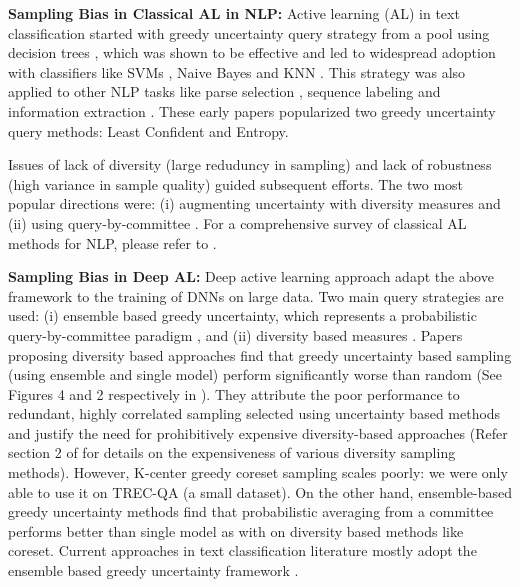 \documentclass[11pt,a4paper]{article}
\begin{document}
\textbf{Sampling Bias in Classical AL in NLP:} Active learning (AL) in text classification started with greedy uncertainty query strategy from a pool using decision trees \cite{lewis1994sequential}, which was shown to be effective and led to widespread adoption with classifiers like SVMs \cite{tong2001support}, Naive Bayes \cite{roy2001toward} and KNN \cite{fujii1998selective}. This strategy was also applied to other NLP tasks like parse selection \cite{baldridge2004active}, sequence labeling \cite{settles2008analysis} and information extraction \cite{thompson1999active}. These early papers popularized two greedy uncertainty query methods: Least Confident and Entropy. 


Issues of lack of diversity (large reduduncy in sampling) \cite{zhang2000value} and lack of robustness (high variance in sample quality)\cite{krogh1994nnensembles} guided subsequent efforts. The two most popular directions were: (i) augmenting uncertainty with diversity measures \cite{hoi2006large, brinker2003incorporating, tang2002active} and (ii) using query-by-committee \cite{mccallum1998employing, liere1997active}. For a comprehensive survey of classical AL methods for NLP, please refer to \cite{settles2009active}.

\textbf{Sampling Bias in Deep AL:} Deep active learning approach adapt the above framework to the training of DNNs on large data. Two main query strategies are used: (i) ensemble based greedy uncertainty, which represents a probabilistic query-by-committee paradigm \cite{gal2017deep, beluch2018power}, and (ii) diversity based measures \cite{sener2018active,ducoffe2018adversarial}. Papers proposing diversity based approaches find that greedy uncertainty based sampling (using ensemble and single model) perform significantly worse than random (See Figures 4 and 2 respectively in \cite{sener2018active,ducoffe2018adversarial}). They attribute the poor performance to redundant, highly correlated sampling selected using uncertainty based methods and justify the need for  prohibitively expensive diversity-based approaches (Refer section 2 of \cite{sener2018active} for details on the expensiveness of various diversity sampling methods). However, K-center greedy coreset sampling scales poorly: we were only able to use it on TREC-QA (a small dataset). On the other hand, ensemble-based greedy uncertainty methods find that probabilistic averaging from a committee \cite{gal2017deep,beluch2018power} performs better than single model as with on diversity based methods like coreset\cite{gissin2019discriminative, beluch2018power}. Current approaches in text classification literature mostly adopt the ensemble based greedy uncertainty framework \cite{siddhant2018deep, lowell2018transferable, zhang2017active}. 
\end{document}
